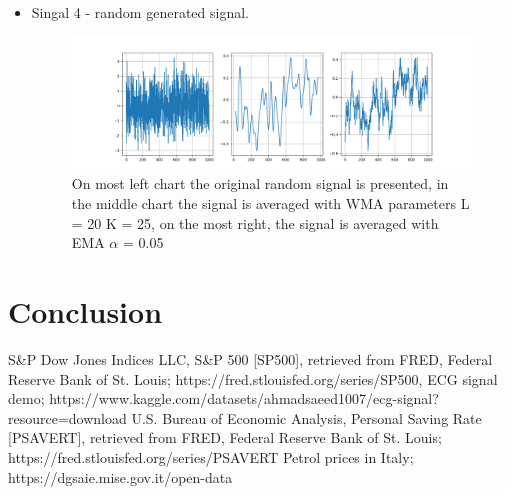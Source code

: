 \documentclass[a4paper,12pt,fleqn]{article}
\begin{document}
\begin{itemize}
                    \item Singal 4 - random generated signal.                    
                    \begin{figure}[ht]
                        \centering
                        \includegraphics[width=1\textwidth]{images/random_signal.png} %
                        \caption{On most left chart the original random signal is presented, in 
                        the middle chart the signal is averaged with WMA parameters L = 20 K = 25, on the most right, the signal is averaged with EMA $\alpha$ = 0.05}
                        \label{fig:RANDOM}
                        
                    \end{figure}
                    
                \end{itemize}

                \newpage
                \section{Conclusion}

        \newpage
        \begin{thebibliography}{99}
         S\&P Dow Jones Indices LLC, S\&P 500 [SP500], retrieved from FRED, Federal Reserve Bank of St. Louis; https://fred.stlouisfed.org/series/SP500, 
         ECG signal demo; https://www.kaggle.com/datasets/ahmadsaeed1007/ecg-signal?resource=download
        U.S. Bureau of Economic Analysis, Personal Saving Rate [PSAVERT], retrieved from FRED, Federal Reserve Bank of St. Louis; https://fred.stlouisfed.org/series/PSAVERT
        Petrol prices in Italy; https://dgsaie.mise.gov.it/open-data
    \end{thebibliography}
         
\end{document}
